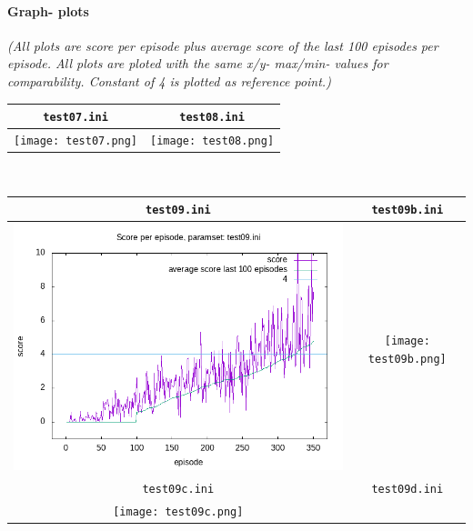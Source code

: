 \documentclass[a4paper]{article}
\begin{document}
\paragraph{Graph- plots}

\textit{(All plots are score per episode plus average score of the last 100 episodes per episode.
All plots are ploted with the same x/y- max/min- values for comparability. Constant of
4 is plotted as reference point.)}
\\
\begin{tabular}{ |c|c| }
  \hline
  \texttt{test07.ini} & \texttt{test08.ini} \\
  \hline
  \texttt{[image: test07.png]} & \texttt{[image: test08.png]} \\
  \hline
\end{tabular}
\\
\begin{tabular}{ |c|c| }
  \hline
  \texttt{test09.ini} & \texttt{test09b.ini} \\
  \hline
  \includegraphics[scale=0.35]{test09.png} & \texttt{[image: test09b.png]} \\
  \hline
  \texttt{test09c.ini} & \texttt{test09d.ini} \\
  \hline
  \texttt{[image: test09c.png]} &  \\
  \hline
\end{tabular}
\end{document}
